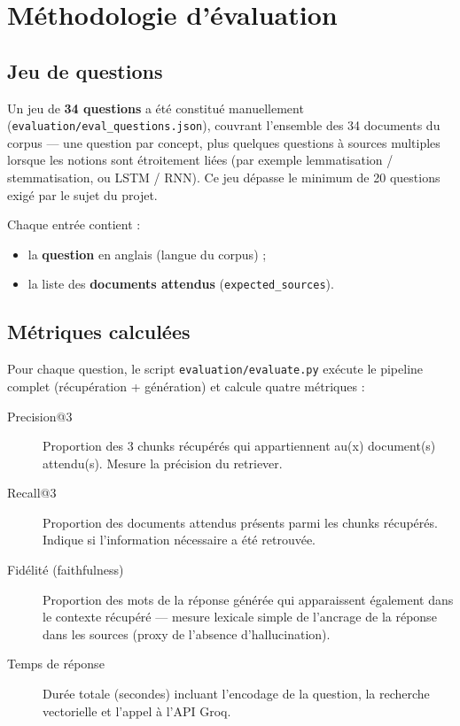 \section{M\'ethodologie d'\'evaluation}
\label{sec:methode}

\subsection{Jeu de questions}

Un jeu de \textbf{34 questions} a \'et\'e constitu\'e manuellement
(\texttt{evaluation/eval\_questions.json}), couvrant l'ensemble des 34 documents du corpus ---
une question par concept, plus quelques questions \`a sources multiples lorsque les notions sont
\'etroitement li\'ees (par exemple lemmatisation / stemmatisation, ou LSTM / RNN). Ce jeu d\'epasse
le minimum de 20 questions exig\'e par le sujet du projet.

Chaque entr\'ee contient :
\begin{itemize}[noitemsep]
  \item la \textbf{question} en anglais (langue du corpus) ;
  \item la liste des \textbf{documents attendus} (\texttt{expected\_sources}).
\end{itemize}

\subsection{M\'etriques calcul\'ees}

Pour chaque question, le script \texttt{evaluation/evaluate.py} ex\'ecute le pipeline complet
(r\'ecup\'eration + g\'en\'eration) et calcule quatre m\'etriques :

\begin{description}
  \item[Precision@3] Proportion des 3 chunks r\'ecup\'er\'es qui appartiennent au(x) document(s)
        attendu(s). Mesure la pr\'ecision du retriever.
  \item[Recall@3] Proportion des documents attendus pr\'esents parmi les chunks r\'ecup\'er\'es.
        Indique si l'information n\'ecessaire a \'et\'e retrouv\'ee.
  \item[Fid\'elit\'e (faithfulness)] Proportion des mots de la r\'eponse g\'en\'er\'ee qui
        apparaissent \'egalement dans le contexte r\'ecup\'er\'e --- mesure lexicale simple de
        l'ancrage de la r\'eponse dans les sources (proxy de l'absence d'hallucination).
  \item[Temps de r\'eponse] Dur\'ee totale (secondes) incluant l'encodage de la question, la
        recherche vectorielle et l'appel \`a l'API Groq.
\end{description}

